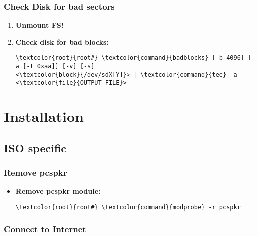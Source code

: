 \documentclass[10pt, a4paper, onecolumn, openany]{book} %
\begin{document}
\subsection{Check Disk for bad sectors}
\begin{enumerate}
    \item \textbf{Unmount FS!}
    \item \textbf{Check disk for bad blocks:}
\begin{Verbatim}[commandchars=\\\{\}]
\textcolor{root}{root#} \textcolor{command}{badblocks} [-b 4096] [-w [-t 0xaa]] [-v] [-s] 
<\textcolor{block}{/dev/sdX[Y]}> | \textcolor{command}{tee} -a <\textcolor{file}{OUTPUT_FILE}>
\end{Verbatim}
\end{enumerate}

\chapter{Installation}
\section{ISO specific}
\subsection{Remove pcspkr}
\begin{itemize}
    \item \textbf{Remove pcspkr module:}
\begin{Verbatim}[commandchars=\\\{\}]
\textcolor{root}{root#} \textcolor{command}{modprobe} -r pcspkr
\end{Verbatim}
\end{itemize}
\subsection{Connect to Internet}
\end{document}
